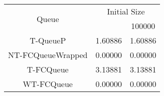 \begin{tabular}{|c|c|c|}
\hline
\multirow{2}{*}{Queue} & \multicolumn{2}{c|}{Initial Size}\\\cline{2-3}& \qquad 10000 \qquad\quad & 100000\\
\hline
\hline
T-QueueP & 1.60886 & 1.60886\\
NT-FCQueueWrapped & 0.00000 & 0.00000\\
T-FCQueue & 3.13881 & 3.13881\\
WT-FCQueue & 0.00000 & 0.00000\\
\hline\end{tabular}
